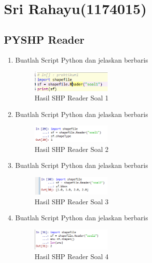 \section{Sri Rahayu(1174015)}
\subsection{PYSHP Reader}
\begin{enumerate}
    \item Buatlah Script Python dan jelaskan berbaris
    
    \hfill\break
    \begin{figure}[H]
		\includegraphics[width=4cm]{figures/1174015/3/No1.png}
		\centering
		\caption{Hasil SHP Reader Soal 1}
    \end{figure}
    
    \item Buatlah Script Python dan jelaskan berbaris
    
    \hfill\break
    \begin{figure}[H]
		\includegraphics[width=4cm]{figures/1174015/3/No2.png}
		\centering
		\caption{Hasil SHP Reader Soal 2}
    \end{figure}
    
    \item Buatlah Script Python dan jelaskan berbaris
    
    \hfill\break
    \begin{figure}[H]
		\includegraphics[width=4cm]{figures/1174015/3/No3.png}
		\centering
		\caption{Hasil SHP Reader Soal 3}
    \end{figure}
    
    \item Buatlah Script Python dan jelaskan berbaris
    
    \hfill\break
    \begin{figure}[H]
		\includegraphics[width=4cm]{figures/1174015/3/No4.png}
		\centering
		\caption{Hasil SHP Reader Soal 4}
    \end{figure}
    

\end{enumerate}
